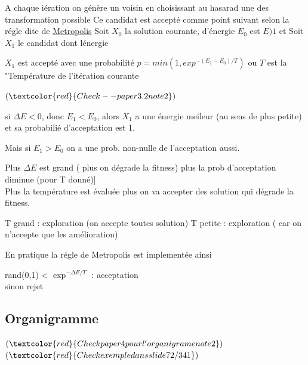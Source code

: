 A chaque i\'eration on g\'en\`ere un voisin en choisissant au hasarad une des transformation possible
Ce candidat est accept\'e comme point suivant selon la r\'egle dite de \underline{Metropolis}
	Soit $X_0$ la solution courante, d'\'energie $E_0$ est $E)1$
	et 
	Soit $X_1$ le candidat dont l\'energie 
	
	$X_1$ est accept\'e avec une probabilit\'e 
	$p=min(1,exp^{-(E_1 - E_0)/T})$
	ou $T$ est la "Temp\'erature de l'it\'eration courante 
	
$(\textcolor{red}{ Check--paper  3.2 note 2})$

si $\Delta E<0$, donc $E_1 < E_0$, alors $X_1$ a une \'energie meileur (au sens de plus petite) et sa probabili\'e d'acceptation est 1.

Mais si  $E_1 > E_0$ on a une prob. non-nulle de l'acceptation aussi.

Plus $\Delta E$ est grand ( plus on d\'egrade la fitness) plus la prob d'acceptation diminue (pour T donn\'e)]\\
Plus la temp\'erature 	est \'evalu\'ee plus on va  accepter des solution qui d\'egrade la fitness.

T grand : exploration (on accepte toutes solution)
T petite : exploration ( car on n'accepte que les am\'elioration)

En pratique la r\'egle de Metropolis est implement\'ee ainsi 
\begin{center}
rand(0,1) < $\exp^{-\Delta E / T}$ : acceptation \\
	sinon \hspace{2cm}rejet 
\end{center}

\subsection*{Organigramme}
$(\textcolor{red}{ Check paper 4 pour l'organigrame  note 2})$
$(\textcolor{red}{ Check exemple dans slide 72/341})$
